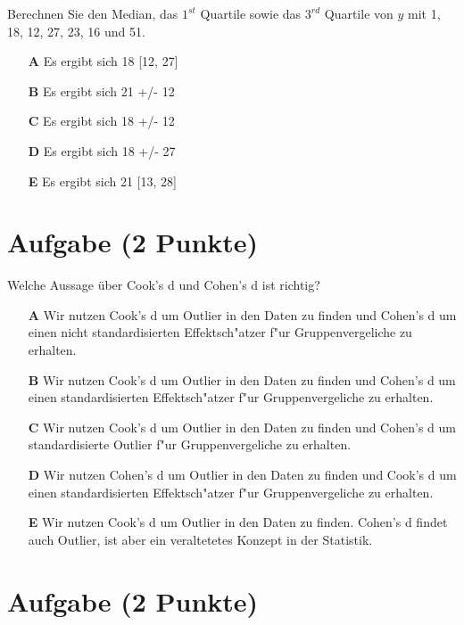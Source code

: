 \documentclass[a4paper, 10pt]{scrartcl}\usepackage[]{graphicx}\usepackage[]{xcolor}
\begin{document}
Berechnen Sie den Median, das $1^{st}$ Quartile sowie das $3^{rd}$ Quartile von $y$ mit 1, 18, 12, 27, 23, 16 und 51.



\begin{enumerate}
\item [\textbf{A} \msquare] Es ergibt sich 18 [12, 27]
\item [\textbf{B} \msquare] Es ergibt sich 21 +/- 12
\item [\textbf{C} \msquare] Es ergibt sich 18 +/- 12
\item [\textbf{D} \msquare] Es ergibt sich 18 +/- 27
\item [\textbf{E} \msquare] Es ergibt sich 21 [13, 28]
\end{enumerate} 

\section{Aufgabe \hfill (2 Punkte)}

Welche Aussage {\"u}ber Cook's d und Cohen's d ist richtig? 



\begin{enumerate}
\item [\textbf{A} \msquare] Wir nutzen Cook's d um Outlier in den Daten zu finden und Cohen's d um einen nicht standardisierten Effektsch{"a}tzer f{"u}r Gruppenvergeliche zu erhalten.
\item [\textbf{B} \msquare] Wir nutzen Cook's d um Outlier in den Daten zu finden und Cohen's d um einen standardisierten Effektsch{"a}tzer f{"u}r Gruppenvergeliche zu erhalten.
\item [\textbf{C} \msquare] Wir nutzen Cook's d um Outlier in den Daten zu finden und Cohen's d um standardisierte Outlier f{"u}r Gruppenvergeliche zu erhalten.
\item [\textbf{D} \msquare] Wir nutzen Cohen's d um Outlier in den Daten zu finden und Cook's d um einen standardisierten Effektsch{"a}tzer f{"u}r Gruppenvergeliche zu erhalten.
\item [\textbf{E} \msquare] Wir nutzen Cook's d um Outlier in den Daten zu finden. Cohen's d findet auch Outlier, ist aber ein veraltetetes Konzept in der Statistik.
\end{enumerate}

\section{Aufgabe \hfill (2 Punkte)}
\end{document}
